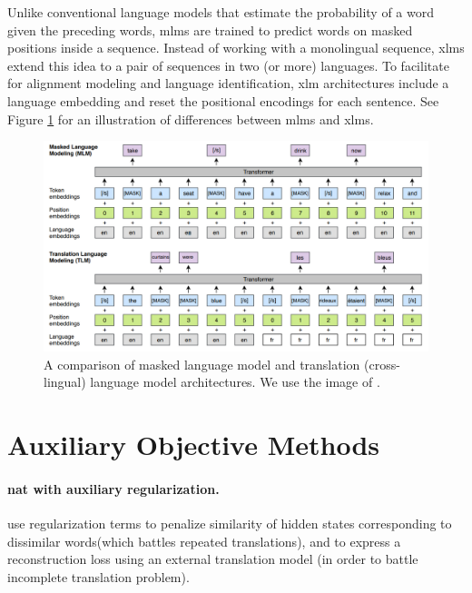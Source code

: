Unlike conventional language models that estimate the probability of a word
given the preceding words, \acp{mlm} are trained to predict words on masked
positions inside a sequence. Instead of working with a monolingual sequence,
\acp{xlm} extend this idea to a pair of sequences in two (or more) languages.
To facilitate for alignment modeling and language identification, \ac{xlm}
architectures include a language embedding and reset the positional encodings
for each sentence. See Figure \ref{fig:mlm-xlm-example} for an illustration of
differences between \acp{mlm} and \acp{xlm}.

\begin{figure}
  \centering

  \includegraphics[width=\textwidth]{img/mlm-xlm.png}

  \caption{A comparison of masked language model and translation
    (cross-lingual) language model architectures. We use the image of
    \citet{conneau-lample-2019-cross}.}%
  \label{fig:mlm-xlm-example}
\end{figure}



\section{Auxiliary Objective Methods}
\label{sec:nat:aux}



\paragraph{\Ac{nat} with auxiliary regularization.}
\citet{wang-etal-2019-nonautoregressive} use regularization terms to penalize
similarity of hidden states corresponding to dissimilar words(which battles
repeated translations), and to express a reconstruction loss using an external
translation model (in order to battle incomplete translation
problem). 

